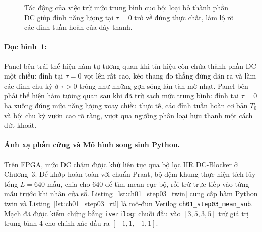 \begin{figure}[H]
\centering
{}
\caption{Tác động của việc trừ mức trung bình cục bộ: loại bỏ thành phần DC giúp đỉnh năng lượng tại $\tau = 0$ trở về đúng thực chất, làm lộ rõ các đỉnh tuần hoàn của dây thanh.}
\label{fig:ch01_mean_remove}
\end{figure}

\paragraph{Đọc hình~\ref{fig:ch01_mean_remove}:}
Panel bên trái thể hiện hàm tự tương quan khi tín hiệu còn chứa thành phần DC một chiều: đỉnh tại $\tau = 0$ vọt lên rất cao, kéo thang đo thẳng đứng dãn ra và làm các đỉnh chu kỳ ở $\tau > 0$ trông như những gợn sóng lăn tăn mờ nhạt. Panel bên phải thể hiện hàm tương quan sau khi đã trừ sạch mức trung bình: đỉnh tại $\tau = 0$ hạ xuống đúng mức năng lượng xoay chiều thực tế, các đỉnh tuần hoàn cơ bản $T_0$ và bội chu kỳ vươn cao rõ ràng, vượt qua ngưỡng phân loại hữu thanh một cách dứt khoát.

\paragraph{Ánh xạ phần cứng và Mô hình song sinh Python.}
Trên FPGA, mức DC chậm được khử liên tục qua bộ lọc IIR DC-Blocker ở Chương~3. Để khớp hoàn toàn với chuẩn Praat, bộ đệm khung thực hiện tích lũy tổng $L = 640$ mẫu, chia cho 640 để tìm mean cục bộ, rồi trừ trực tiếp vào từng mẫu trước khi nhân cửa sổ. Listing~\ref{lst:ch01_step03_twin} cung cấp hàm Python twin và Listing~\ref{lst:ch01_step03_rtl} là mô-đun Verilog \texttt{ch01\_step03\_mean\_sub}. Mạch đã được kiểm chứng bằng \texttt{iverilog}: chuỗi đầu vào $[3, 5, 3, 5]$ trừ giá trị trung bình $4$ cho chính xác đầu ra $[-1, 1, -1, 1]$.

